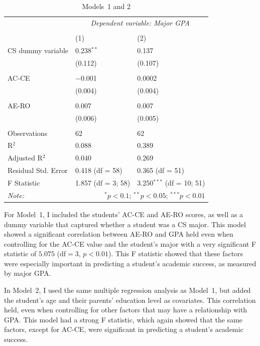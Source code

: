\begin{table}[!htbp]
  \centering
  \caption{Models~1 and 2}
  \label{tab:models12}
  \begin{tabular}{@{\extracolsep{5pt}}lll}
  \toprule
   & \multicolumn{2}{c}{\textit{Dependent variable: Major GPA}} \\
  \cmidrule{2-3}
  \\[-1.8ex] & (1) & (2)\\
  \midrule
  CS dummy variable & 0.238$^{**}$ & 0.137 \\
    & (0.112) & (0.107) \\
    & & \\
  AC-CE & $-$0.001 & 0.0002 \\
    & (0.004) & (0.004) \\
    & & \\
  AE-RO & 0.007 & 0.007 \\
    & (0.006) & (0.005) \\
    & & \\
  \midrule
  Observations & 62 & 62 \\
  R$^{2}$ & 0.088 & 0.389 \\
  Adjusted R$^{2}$ & 0.040 & 0.269 \\
  Residual Std. Error & 0.418 (df = 58) & 0.365 (df = 51) \\
  F Statistic & 1.857 (df = 3; 58) & 3.250$^{***}$ (df = 10; 51) \\
  \bottomrule
  \textit{Note:}  & \multicolumn{2}{r}{$^{*}p<0.1$; $^{**}p<0.05$; $^{***}p<0.01$} \\
  \end{tabular}
\end{table}

For Model~1, I included the students' AC-CE and AE-RO scores, as well as a dummy variable that captured whether a student was a CS major. This model showed a significant correlation between AE-RO and GPA held even when controlling for the AC-CE value and the student's major with a very significant F statistic of $5.075$ (df$=3$, $p<0.01$). This F statistic showed that these factors were especially important in predicting a student's academic success, as measured by major GPA.

In Model~2, I used the same multiple regression analysis as Model~1, but added the student's age and their parents' education level as covariates. This correlation held, even when controlling for other factors that may have a relationship with GPA. This model had a strong F statistic, which again showed that the same factors, except for AC-CE, were significant in predicting a student's academic success.

